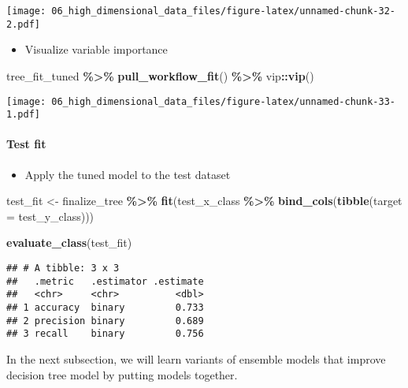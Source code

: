 \documentclass[
]{book}
\newenvironment{Shaded}{\begin{snugshade}}{\end{snugshade}}
\newcommand{\DataTypeTok}[1]{\textcolor[rgb]{0.13,0.29,0.53}{#1}}
\newcommand{\KeywordTok}[1]{\textcolor[rgb]{0.13,0.29,0.53}{\textbf{#1}}}
\newcommand{\NormalTok}[1]{#1}
\newcommand{\OperatorTok}[1]{\textcolor[rgb]{0.81,0.36,0.00}{\textbf{#1}}}
\newcommand{\StringTok}[1]{\textcolor[rgb]{0.31,0.60,0.02}{#1}}
\providecommand{\tightlist}{%
  \setlength{\itemsep}{0pt}\setlength{\parskip}{0pt}}
\begin{document}
\texttt{[image: 06\_high\_dimensional\_data\_files/figure-latex/unnamed-chunk-32-2.pdf]}

\begin{itemize}
\tightlist
\item
  Visualize variable importance
\end{itemize}

\begin{Shaded}
\begin{Highlighting}[]
\NormalTok{tree\_fit\_tuned }\OperatorTok{\%\textgreater{}\%}
\StringTok{  }\KeywordTok{pull\_workflow\_fit}\NormalTok{() }\OperatorTok{\%\textgreater{}\%}
\StringTok{  }\NormalTok{vip}\OperatorTok{::}\KeywordTok{vip}\NormalTok{()}
\end{Highlighting}
\end{Shaded}

\texttt{[image: 06\_high\_dimensional\_data\_files/figure-latex/unnamed-chunk-33-1.pdf]}

\hypertarget{test-fit-1}{%
\paragraph{Test fit}\label{test-fit-1}}

\begin{itemize}
\tightlist
\item
  Apply the tuned model to the test dataset
\end{itemize}

\begin{Shaded}
\begin{Highlighting}[]
\NormalTok{test\_fit \textless{}{-}}\StringTok{ }\NormalTok{finalize\_tree }\OperatorTok{\%\textgreater{}\%}\StringTok{ }
\StringTok{  }\KeywordTok{fit}\NormalTok{(test\_x\_class }\OperatorTok{\%\textgreater{}\%}\StringTok{ }\KeywordTok{bind\_cols}\NormalTok{(}\KeywordTok{tibble}\NormalTok{(}\DataTypeTok{target =}\NormalTok{ test\_y\_class)))}

\KeywordTok{evaluate\_class}\NormalTok{(test\_fit)}
\end{Highlighting}
\end{Shaded}

\begin{verbatim}
## # A tibble: 3 x 3
##   .metric   .estimator .estimate
##   <chr>     <chr>          <dbl>
## 1 accuracy  binary         0.733
## 2 precision binary         0.689
## 3 recall    binary         0.756
\end{verbatim}

In the next subsection, we will learn variants of ensemble models that improve decision tree model by putting models together.
\end{document}
